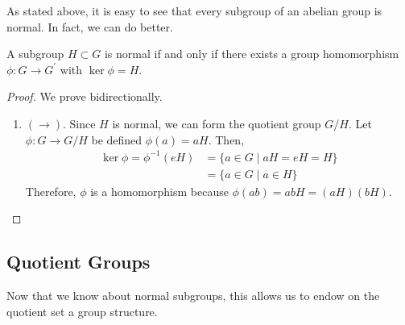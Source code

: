   As stated above, it is easy to see that every subgroup of an abelian group is normal. In fact, we can do better. 

  \begin{lemma} 
    A subgroup $H \subset G$ is normal if and only if there exists a group homomorphism $\phi: G \rightarrow G^\prime$ with $\ker{\phi} = H$. 
  \end{lemma}
  \begin{proof}
    We prove bidirectionally. 
    \begin{enumerate}
      \item $(\rightarrow)$. Since $H$ is normal, we can form the quotient group $G/H$. Let $\phi: G \rightarrow G/H$ be defined $\phi(a) = aH$. Then, 
      \begin{align}
        \ker{\phi} = \phi^{-1}(eH) & = \{a \in G \mid aH = eH = H \} \\
                                   & = \{a \in G \mid a \in H \}
      \end{align}
      Therefore, $\phi$ is a homomorphism because $\phi(ab) = abH = (aH)(bH)$. 
    \end{enumerate}
  \end{proof}

  \begin{example}
    
  \end{example}

  \begin{example}
    
  \end{example}

\subsection{Quotient Groups}

  Now that we know about normal subgroups, this allows us to endow on the quotient set a group structure. 

